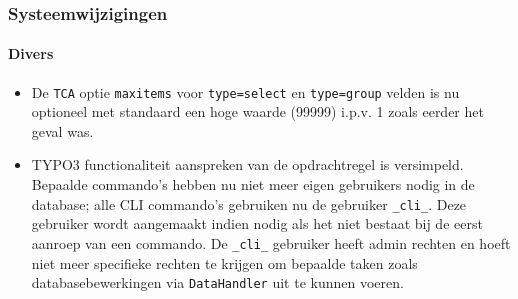 \begin{frame}[fragile]
	\frametitle{Systeemwijzigingen}
	\framesubtitle{Divers}

	\begin{itemize}
		\item De \texttt{TCA} optie \texttt{maxitems} voor \texttt{type=select} en \texttt{type=group}
			velden is nu optioneel met standaard een hoge waarde (99999) i.p.v. 1 zoals eerder het geval was.

		\item TYPO3 functionaliteit aanspreken van de opdrachtregel is versimpeld. Bepaalde commando's hebben nu
		 	niet meer eigen gebruikers nodig in de database; alle CLI commando's gebruiken nu de gebruiker \texttt{\_cli\_}.
			Deze gebruiker wordt aangemaakt indien nodig als het niet bestaat bij de eerst aanroep van een commando.
			De \texttt{\_cli\_} gebruiker heeft admin rechten en hoeft niet meer specifieke rechten te krijgen om bepaalde
			taken zoals databasebewerkingen via \texttt{DataHandler} uit te kunnen voeren.

	\end{itemize}

\end{frame}


